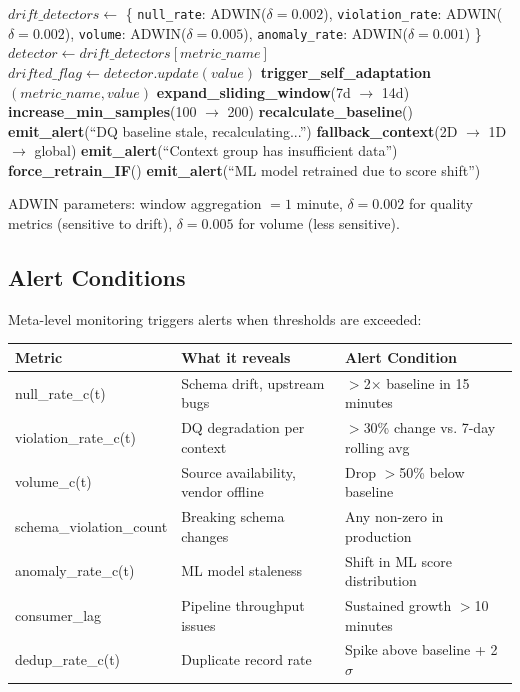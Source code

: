 \begin{algorithm}[H]
\caption{ADWIN Drift Detection on Quality Meta-Stream}
\label{alg:adwin}
\begin{algorithmic}[1]
\State $drift\_detectors \gets$ \{
    \texttt{null\_rate}: ADWIN($\delta=0.002$),
    \texttt{violation\_rate}: ADWIN($\delta=0.002$),
    \texttt{volume}: ADWIN($\delta=0.005$),
    \texttt{anomaly\_rate}: ADWIN($\delta=0.001$)
\}
\Statex
{}
    \State $detector \gets drift\_detectors[metric\_name]$
    \State $drifted\_flag \gets detector.update(value)$
        \State \textbf{trigger\_self\_adaptation}$(metric\_name, value)$
    \EndIf
\EndProcedure
\Statex
{}
        \State \textbf{expand\_sliding\_window}(7d $\to$ 14d)
        \State \textbf{increase\_min\_samples}(100 $\to$ 200)
        \State \textbf{recalculate\_baseline}()
        \State \textbf{emit\_alert}(``DQ baseline stale, recalculating...'')
        \State \textbf{fallback\_context}(2D $\to$ 1D $\to$ global)
        \State \textbf{emit\_alert}(``Context group has insufficient data'')
        \State \textbf{force\_retrain\_IF}()
        \State \textbf{emit\_alert}(``ML model retrained due to score shift'')
    \EndIf
\EndProcedure
\end{algorithmic}
\end{algorithm}

ADWIN parameters: window aggregation $= 1$ minute, $\delta = 0.002$ for quality metrics (sensitive to drift), $\delta = 0.005$ for volume (less sensitive).

\subsection{Alert Conditions}

Meta-level monitoring triggers alerts when thresholds are exceeded:

\begin{longtable}{|m{4cm}|m{6cm}|m{4cm}|}
\hline
\textbf{Metric} & \textbf{What it reveals} & \textbf{Alert Condition} \\ \hline
null\_rate\_c(t) & Schema drift, upstream bugs & $>$2$\times$ baseline in 15 minutes \\ \hline
violation\_rate\_c(t) & DQ degradation per context & $>$30\% change vs. 7-day rolling avg \\ \hline
volume\_c(t) & Source availability, vendor offline & Drop $>$50\% below baseline \\ \hline
schema\_violation\_count & Breaking schema changes & Any non-zero in production \\ \hline
anomaly\_rate\_c(t) & ML model staleness & Shift in ML score distribution \\ \hline
consumer\_lag & Pipeline throughput issues & Sustained growth $>$10 minutes \\ \hline
dedup\_rate\_c(t) & Duplicate record rate & Spike above baseline + 2$\sigma$ \\ \hline
\end{longtable}

